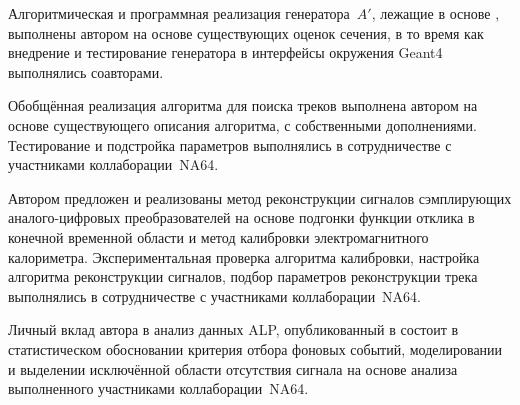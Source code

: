 Алгоритмическая и программная реализация генератора~$A'$, лежащие в
основе \cite{DMG4-comphy-024, alps-PRD, DMG4-comphy-021}, выполнены
автором на основе существующих оценок сечения, в то время как внедрение и тестирование
генератора в интерфейсы окружения Geant4 выполнялись соавторами.

Обобщённая реализация алгоритма для поиска треков выполнена автором
на основе существующего описания алгоритма, с собственными дополнениями.
Тестирование и подстройка параметров выполнялись в сотрудничестве с
участниками коллаборации~NA64.

Автором предложен и реализованы метод реконструкции сигналов сэмплирующих
аналого-цифровых преобразователей
на основе подгонки функции отклика в конечной временной области и метод
калибровки электромагнитного калориметра.
Экспериментальная проверка алгоритма калибровки, настройка
алгоритма реконструкции сигналов, подбор параметров реконструкции трека
выполнялись в сотрудничестве с
участниками коллаборации~NA64.

Личный вклад автора в анализ данных ALP, опубликованный в \cite{alps-PRL}
состоит в статистическом обосновании критерия отбора фоновых событий,
моделировании и выделении исключённой области отсутствия сигнала на
основе анализа выполненного участниками коллаборации~NA64.

